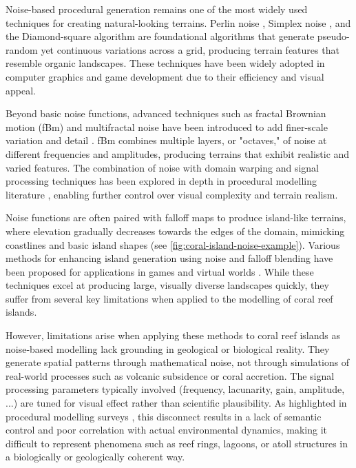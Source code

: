 Noise-based procedural generation remains one of the most widely used techniques for creating natural-looking terrains. Perlin noise \cite{Perlin1985}, Simplex noise \cite{Perlin2001}, and the Diamond-square algorithm \cite{Fournier1982} are foundational algorithms that generate pseudo-random yet continuous variations across a grid, producing terrain features that resemble organic landscapes. These techniques have been widely adopted in computer graphics and game development due to their efficiency and visual appeal.

Beyond basic noise functions, advanced techniques such as fractal Brownian motion (fBm) and multifractal noise have been introduced to add finer-scale variation and detail \cite{Musgrave1989,Ebert2003}. fBm combines multiple layers, or "octaves," of noise at different frequencies and amplitudes, producing terrains that exhibit realistic and varied features. The combination of noise with domain warping and signal processing techniques has been explored in depth in procedural modelling literature \cite{Reinhard2010}, enabling further control over visual complexity and terrain realism.

Noise functions are often paired with falloff maps to produce island-like terrains, where elevation gradually decreases towards the edges of the domain, mimicking coastlines and basic island shapes (see \cref{fig:coral-island-noise-example}). Various methods for enhancing island generation using noise and falloff blending have been proposed for applications in games and virtual worlds \cite{Olsen2004}. While these techniques excel at producing large, visually diverse landscapes quickly, they suffer from several key limitations when applied to the modelling of coral reef islands.

However, limitations arise when applying these methods to coral reef islands as noise-based modelling lack grounding in geological or biological reality. They generate spatial patterns through mathematical noise, not through simulations of real-world processes such as volcanic subsidence or coral accretion. The signal processing parameters typically involved (frequency, lacunarity, gain, amplitude, ...) are tuned for visual effect rather than scientific plausibility. As highlighted in procedural modelling surveys \cite{Smelik2009,Galin2019}, this disconnect results in a lack of semantic control and poor correlation with actual environmental dynamics, making it difficult to represent phenomena such as reef rings, lagoons, or atoll structures in a biologically or geologically coherent way.

